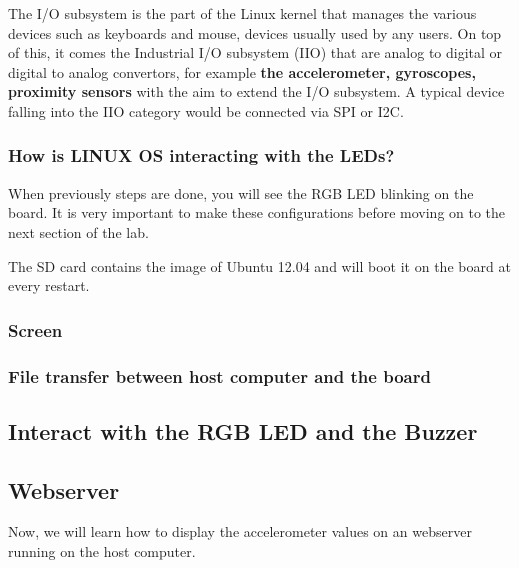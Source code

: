 The I/O subsystem is the part of the Linux kernel that manages the various devices such as keyboards and mouse, devices usually used by any users. On top of this, it comes the Industrial I/O subsystem (IIO) that are analog to digital or digital to analog convertors, for example \textbf{the accelerometer, gyroscopes, proximity sensors} with the aim to extend the I/O subsystem. A typical device falling into the IIO category would be connected via SPI or I2C.






\subsubsection{How is LINUX OS interacting with the LEDs?}




When previously steps are done, you will see the RGB LED blinking on the board. It is very
important to make these configurations before moving on to the next section of the lab.


The SD card contains the image of Ubuntu 12.04 and will boot it on the board at every restart.

\subsubsection{Screen}

\subsubsection{File transfer between host computer and the board}




\subsection{Interact with the RGB LED and the Buzzer}




\subsection{Webserver}
Now, we will learn how to display the accelerometer values on an webserver running
on the host computer.






